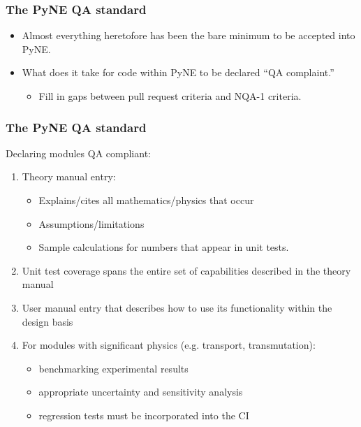 \documentclass[12pt]{beamer}
\begin{document}
\begin{frame}
\frametitle{The PyNE QA standard}

\begin{itemize}
\item{Almost everything heretofore has been the bare minimum to be accepted into PyNE.}
\item{What does it take for code within PyNE to be declared ``QA complaint.''}
    \begin{itemize}
    \item{Fill in gaps between pull request criteria and NQA-1 criteria.}
    \end{itemize}
\end{itemize}

\end{frame}

\begin{frame}
\frametitle{The PyNE QA standard}

Declaring modules QA compliant:
\begin{enumerate}
\item{Theory manual entry}:
    \begin{itemize}
    \item{Explains/cites all mathematics/physics that occur}
    \item{Assumptions/limitations}
    \item{Sample calculations for numbers that appear in unit tests.}
    \end{itemize}
\item{Unit test coverage spans the entire set of capabilities described in the theory manual}
\item{User manual entry that describes how to use its functionality within the design basis}
\item{For modules with significant physics (e.g. transport, transmutation):}
    \begin{itemize}
    \item{benchmarking experimental results}
    \item{appropriate uncertainty and sensitivity analysis}
    \item{regression tests must be incorporated into the CI}
    \end{itemize}
\end{enumerate}

\end{frame}
\end{document}
